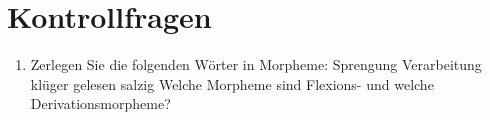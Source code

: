 \label{last-page-hpsg-teil}






\section*{Kontrollfragen}


\begin{enumerate}
\item Zerlegen Sie die folgenden Wörter in Morpheme:
\eal
\ex Sprengung
\ex Verarbeitung
\ex klüger
\ex gelesen
\ex salzig
\zl
Welche Morpheme sind Flexions- und welche Derivationsmorpheme?

\end{enumerate}

